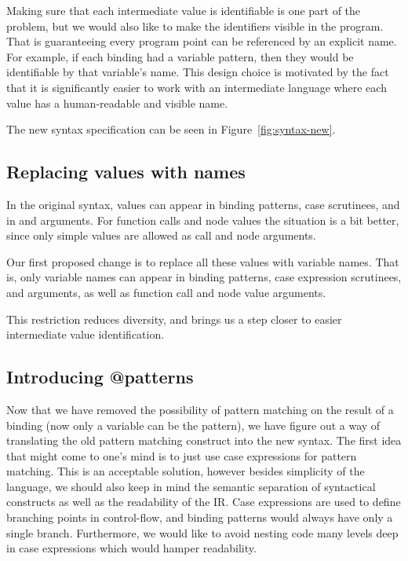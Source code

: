 \documentclass[main.tex]{subfiles}
\begin{document}
  Making sure that each intermediate value is identifiable is one part of the problem, but we would also like to make the identifiers visible in the program. That is guaranteeing every program point can be referenced by an explicit name. For example, if each binding had a variable pattern, then they would be identifiable by that variable's name. This design choice is motivated by the fact that it is significantly easier to work with an intermediate language where each value has a human-readable and visible name.
  
  The new syntax specification can be seen in Figure~\ref{fig:syntax-new}.

  \subsection{Replacing values with names}

  In the original syntax, values can appear in binding patterns, case scrutinees, and in  and  arguments. For function calls and node values the situation is a bit better, since only simple values are allowed as call and node arguments.

  Our first proposed change is to replace all these values with variable names. That is, only variable names can appear in binding patterns, case expression scrutinees,  and  arguments, as well as function call and node value arguments.

  This restriction reduces diversity, and brings us a step closer to easier intermediate value identification.

  \subsection{Introducing @patterns}

  Now that we have removed the possibility of pattern matching on the result of a binding (now only a variable can be the pattern), we have figure out a way of translating the old pattern matching construct into the new syntax. The first idea that might come to one's mind is to just use case expressions for pattern matching. This is an acceptable solution, however besides simplicity of the language, we should also keep in mind the semantic separation of syntactical constructs as well as the readability of the IR. Case expressions are used to define branching points in control-flow, and binding patterns would always have only a single branch. Furthermore, we would like to avoid nesting code many levels deep in case expressions which would hamper readability.
\end{document}
